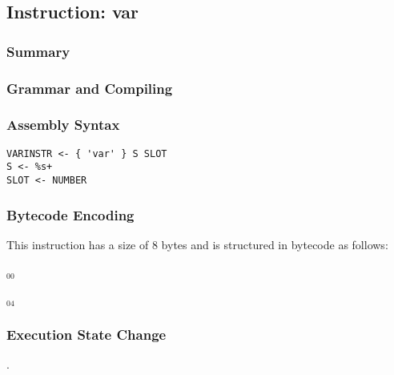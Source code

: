 \subsection{Instruction: var}

\subsubsection{Summary}


\subsubsection{Grammar and Compiling}


\subsubsection{Assembly Syntax}

\begin{myquote}
\begin{verbatim}
VARINSTR <- { 'var' } S SLOT
S <- %s+
SLOT <- NUMBER
\end{verbatim}
\end{myquote}

\subsubsection{Bytecode Encoding}

This instruction has a size of 8 bytes and is structured in bytecode as follows:

$_{00}$\ 



$_{04}$\ 


\subsubsection{Execution State Change}

.


